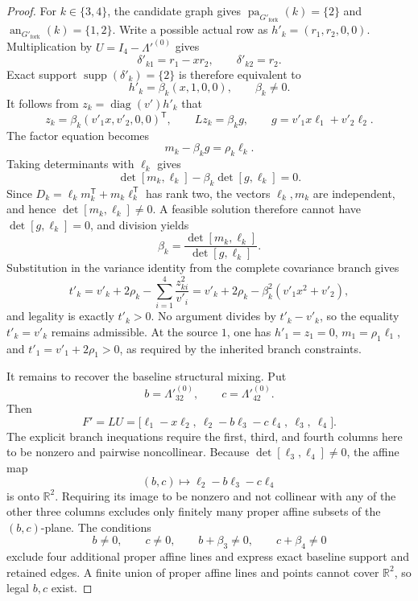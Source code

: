 \documentclass{article}
\begin{document}
\begin{proof}
For \(k\in\{3,4\}\), the candidate graph gives \(\operatorname{pa}_{G'_{\mathrm{fork}}}(k)=\{2\}\) and \(\operatorname{an}_{G'_{\mathrm{fork}}}(k)=\{1,2\}\). Write a possible actual row as \(h'_k=(r_1,r_2,0,0)\). Multiplication by \(U=I_4-\Lambda'^{(0)}\) gives
\[
 \delta'_{k1}=r_1-xr_2,\qquad \delta'_{k2}=r_2.
\]
Exact support \(\operatorname{supp}(\delta'_k)=\{2\}\) is therefore equivalent to
\[
 h'_k=\beta_k(x,1,0,0),\qquad \beta_k\ne0.
\]
It follows from \(z_k=\operatorname{diag}(v')h'_k\) that
\[
 z_k=\beta_k(v'_1x,v'_2,0,0)^{\mathsf T},\qquad
 Lz_k=\beta_k g,\qquad
 g=v'_1x\ell_1+v'_2\ell_2.
\]
The factor equation becomes
\[
 m_k-\beta_kg=\rho_k\ell_k.
\]
Taking determinants with \(\ell_k\) gives
\[
 \det[m_k,\ell_k]-\beta_k\det[g,\ell_k]=0.
\]
Since \(D_k=\ell_km_k^{\mathsf T}+m_k\ell_k^{\mathsf T}\) has rank two, the vectors \(\ell_k,m_k\) are independent, and hence \(\det[m_k,\ell_k]\ne0\). A feasible solution therefore cannot have \(\det[g,\ell_k]=0\), and division yields
\[
 \beta_k=\frac{\det[m_k,\ell_k]}{\det[g,\ell_k]}.
\]
Substitution in the variance identity from the complete covariance branch gives
\[
 t'_k
 =v'_k+2\rho_k-\sum_{i=1}^{4}\frac{z_{ki}^{2}}{v'_i}
 =v'_k+2\rho_k-\beta_k^2(v'_1x^2+v'_2),
\]
and legality is exactly \(t'_k>0\). No argument divides by \(t'_k-v'_k\), so the equality \(t'_k=v'_k\) remains admissible. At the source \(1\), one has \(h'_1=z_1=0\), \(m_1=\rho_1\ell_1\), and \(t'_1=v'_1+2\rho_1>0\), as required by the inherited branch constraints.

It remains to recover the baseline structural mixing. Put
\[
 b=\Lambda'^{(0)}_{32},\qquad c=\Lambda'^{(0)}_{42}.
\]
Then
\[
 F'=LU
 =\bigl[\ell_1-x\ell_2,\ \ell_2-b\ell_3-c\ell_4,\ \ell_3,\ \ell_4\bigr].
\]
The explicit branch inequations require the first, third, and fourth columns here to be nonzero and pairwise noncollinear. Because \(\det[\ell_3,\ell_4]\ne0\), the affine map
\[
 (b,c)\longmapsto\ell_2-b\ell_3-c\ell_4
\]
is onto \(\mathbb R^2\). Requiring its image to be nonzero and not collinear with any of the other three columns excludes only finitely many proper affine subsets of the \((b,c)\)-plane. The conditions
\[
 b\ne0,\qquad c\ne0,\qquad b+\beta_3\ne0,\qquad c+\beta_4\ne0
\]
exclude four additional proper affine lines and express exact baseline support and retained edges. A finite union of proper affine lines and points cannot cover \(\mathbb R^2\), so legal \(b,c\) exist.


\end{proof}
\end{document}
